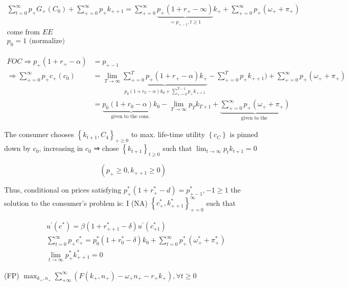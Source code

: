 \documentclass[10pt]{article}
\begin{document}
$$
\begin{gathered}
\sum_{t=0}^{\infty} p_{+} G_{+}\left(C_{0}\right)+\sum_{+=0}^{\infty} p_{+} k_{++1}=\sum_{+=0}^{\infty} \underbrace{p_{+}\left(1+r_{+}-\infty\right)}_{=p_{+-1}, t \geq 1} k_{+}+\sum_{+=0}^{\infty} p_{+}\left(\omega_{+}+\pi_{+}\right) \\
\text {come from } E E \\
p_{0}=1 \text { (normalize) }
\end{gathered}
$$

$$
\begin{aligned}
F O C \Rightarrow p_{+}\left(1+r_{+}-\alpha\right) & =p_{+-1} \\
\Rightarrow \sum_{+=0}^{\infty} p_{+} c_{+}\left(c_{0}\right) & =\lim _{T \rightarrow \infty} \underbrace{\sum_{+=0}^{T} p_{+}\left(1+r_{+}-\alpha\right) k_{+}}_{p_{0}\left(1+r_{0}-\alpha\right) k_{0}+\sum_{+=0}^{T-1} p_{+} k_{++1}}-\sum_{+=0}^{T} p_{+} k_{++1})+\sum_{+=0}^{\infty} p_{+}\left(\omega_{+}+\pi_{+}\right) \\
& =\underbrace{p_{0}\left(1+r_{0}-\alpha\right) k_{0}}_{\text {given to the cons. }}-\lim _{T \rightarrow \infty} p_{T} k_{T+1}+\underbrace{\sum_{+=0}^{\infty} p_{+}\left(\omega_{+}+\pi_{+}\right)}_{\text {given to the }}
\end{aligned}
$$

The consumer chooses $\left\{k_{t+1}, C_{4}\right\}_{+\geq 0}$ to max. life-time utility $\left\{c_{C}\right\}$ is pinned down by $c_{0}$, increasing in $c_{0}$ ⇒ chose $\left\{k_{t+1}\right\}_{t \geqslant 0}$ such that $\lim _{t \rightarrow \infty} p_{t} k_{t+1}=0$

$$
\left(p_{+} \geq 0, k_{++1} \geq 0\right)
$$

Thus, conditional on prices satisfying $p_{+}^{*}\left(1+r_{+}^{*}-d\right)=p_{+-1}^{*},-1 \geqslant 1$ the solution to the consumer's problem is: I (NA) $\left\{c_{+}^{*}, k_{++1}^{*}\right\}_{+=0}^{\infty}$ such that

$$
\begin{aligned}
& u^{\prime}\left(c^{*}\right)=\beta\left(1+r_{++1}^{*}-\delta\right) u^{\prime}\left(c_{+1}^{*}\right) \\
& \sum_{t=0}^{\infty} p_{+} c_{+}^{*}=p_{0}^{*}\left(1+r_{0}^{*}-\delta\right) k_{0}+\sum_{t=0}^{\infty} p_{+}^{*}\left(\omega_{+}^{*}+\pi_{+}^{*}\right) \\
& \lim _{t \rightarrow \infty} p_{+}^{*} k_{++1}^{*}=0
\end{aligned}
$$

(FP) $\max _{k_{+}, n_{+}} \sum_{+\infty}^{\infty}\left(F\left(k_{+}, n_{+}\right)-\omega_{+} n_{+}-r_{+} k_{+}\right), \forall t \geq 0$
\end{document}
